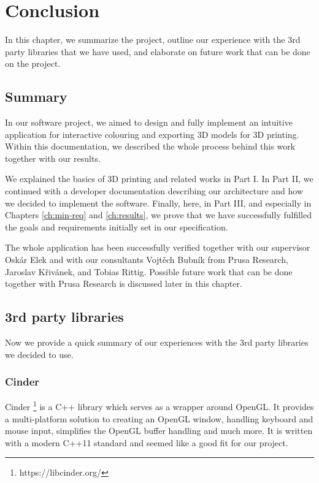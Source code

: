 \chapter{Conclusion}

In this chapter, we summarize the project, outline our experience with the 3rd party libraries that we have used, and elaborate on future work that can be done on the project.

\section{Summary}

In our software project, we aimed to design and fully implement an intuitive application for interactive colouring and exporting 3D models for 3D printing.
Within this documentation, we described the whole process behind this work together with our results.

We explained the basics of 3D printing and related works in Part I.
In Part II, we continued with a developer documentation describing our architecture and how we decided to implement the software.
Finally, here, in Part III, and especially in Chapters \ref{ch:min-req} and \ref{ch:results}, we prove that we have successfully fulfilled the goals and requirements initially set in our specification.

The whole application has been successfully verified together with our supervisor Oskár Elek and with our consultants Vojtěch Bubník from Prusa Research, Jaroslav Křivánek, and Tobias Rittig.
Possible future work that can be done together with Prusa Research is discussed later in this chapter.

\section{3rd party libraries}

Now we provide a quick summary of our experiences with the 3rd party libraries we decided to use.

\subsection{Cinder}

Cinder \footnote{https://libcinder.org/} is a C++ library which serves as a wrapper around OpenGL. It provides a multi-platform solution to creating an OpenGL window, handling keyboard and mouse input, simplifies the OpenGL buffer handling and much more. It is written with a modern C++11 standard and seemed like a good fit for our project.

